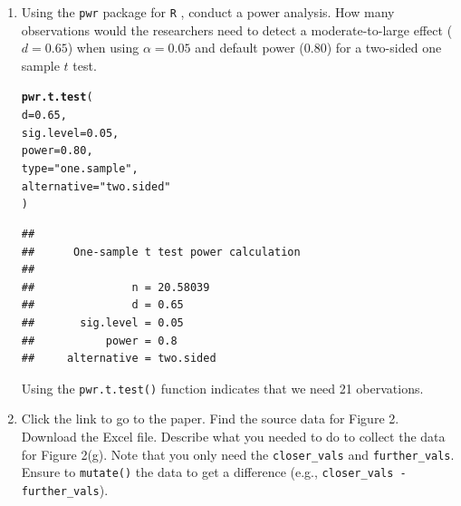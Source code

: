 \documentclass{article}\usepackage[]{graphicx}\usepackage[]{xcolor}
\makeatletter
\newcommand{\hlnum}[1]{\textcolor[rgb]{0.686,0.059,0.569}{#1}}%
\newcommand{\hlsng}[1]{\textcolor[rgb]{0.192,0.494,0.8}{#1}}%
\newcommand{\hldef}[1]{\textcolor[rgb]{0.345,0.345,0.345}{#1}}%
\newcommand{\hlkwc}[1]{\textcolor[rgb]{0.333,0.667,0.333}{#1}}%
\newcommand{\hlkwd}[1]{\textcolor[rgb]{0.737,0.353,0.396}{\textbf{#1}}}%
\newenvironment{kframe}{%
 \def\at@end@of@kframe{}%
 \ifinner\ifhmode%
  \def\at@end@of@kframe{\end{minipage}}%
  \begin{minipage}{\columnwidth}%
 \fi\fi%
 \def\FrameCommand##1{\hskip\@totalleftmargin \hskip-\fboxsep
 \colorbox{shadecolor}{##1}\hskip-\fboxsep
     \hskip-\linewidth \hskip-\@totalleftmargin \hskip\columnwidth}%
 \MakeFramed {\advance\hsize-\width
   \@totalleftmargin\z@ \linewidth\hsize
   \@setminipage}}%
 {\par\unskip\endMakeFramed%
 \at@end@of@kframe}
\newenvironment{knitrout}{}{} %
\makeatother
\begin{document}
\begin{enumerate}
\item Using the \texttt{pwr} package for \texttt{R} \citep{pwr},
conduct a power analysis. How many observations would the researchers 
need to detect a moderate-to-large effect ($d=0.65$) when using 
$\alpha=0.05$ and default power (0.80) for a two-sided one sample 
$t$ test.
\begin{knitrout}\scriptsize
{}\color{fgcolor}\begin{kframe}


{\ttfamily\noindent\color{warningcolor}{\#\# Warning: package 'pwr' was built under R version 4.4.3}}\end{kframe}
\end{knitrout}
\begin{knitrout}\scriptsize
{}\color{fgcolor}\begin{kframe}
\begin{alltt}
\hlkwd{pwr.t.test}\hldef{(}
  \hlkwc{d} \hldef{=} \hlnum{0.65}\hldef{,}
  \hlkwc{sig.level} \hldef{=} \hlnum{0.05}\hldef{,}
  \hlkwc{power} \hldef{=} \hlnum{0.80}\hldef{,}
  \hlkwc{type} \hldef{=} \hlsng{"one.sample"}\hldef{,}
  \hlkwc{alternative} \hldef{=} \hlsng{"two.sided"}
\hldef{)}
\end{alltt}
\begin{verbatim}
## 
##      One-sample t test power calculation 
## 
##               n = 20.58039
##               d = 0.65
##       sig.level = 0.05
##           power = 0.8
##     alternative = two.sided
\end{verbatim}
\end{kframe}
\end{knitrout}
Using the \verb|pwr.t.test()| function indicates that we need 21 obervations.

\item Click the link to go to the paper. Find the source data for 
Figure 2. Download the Excel file. Describe what you needed to
do to collect the data for Figure 2(g). Note that you only need the 
\texttt{closer\_vals} and \texttt{further\_vals}. Ensure to 
\texttt{mutate()} the data to get a difference 
(e.g., \texttt{closer\_vals - further\_vals}).


\end{enumerate}
\end{document}
